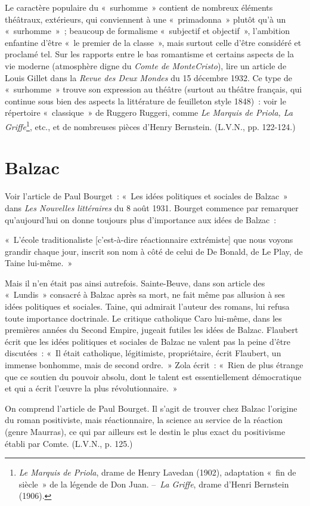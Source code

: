 \documentclass[french,twoside]{book} %
\newenvironment{quoteblock}%
  {\begin{quoting}}
  {\end{quoting}}
\newenvironment{quotebar}{%
    \def\FrameCommand{{\color{rubric!10!}\vrule width 0.5em} \hspace{0.9em}}%
    \def\OuterFrameSep{\itemsep} %
    \MakeFramed {\advance\hsize-\width \FrameRestore}
  }%
  {%
    \endMakeFramed
  }
\renewenvironment{quoteblock}%
  {%
    \savenotes
    \setstretch{0.9}
    \normalfont
    \begin{quotebar}
  }
  {%
    \end{quotebar}
    \spewnotes
  }
\begin{document}
Le caractère populaire du « surhomme » contient de nombreux éléments théâtraux, extérieurs, qui conviennent à une « primadonna » plutôt qu’à un « surhomme » ; beaucoup de formalisme « subjectif et objectif », l’ambition enfantine d’être « le premier de la classe », mais surtout celle d’être considéré et proclamé tel. Sur les rapports entre le bas romantisme et certains aspects de la vie moderne (atmosphère digne du \emph{Comte de MonteCristo}), lire un article de Louis Gillet dans la \emph{Revue des Deux Mondes} du 15 décembre 1932. Ce type de « surhomme » trouve son expression au théâtre (surtout au théâtre français, qui continue sous bien des aspects la littérature de feuilleton style 1848) : voir le répertoire « classique » de Ruggero Ruggeri, comme \emph{Le Marquis de Priola, La Griffe}\footnote{\emph{Le Marquis de Priola}, drame de Henry Lavedan (1902), adaptation « fin de siècle » de la légende de Don Juan. – \emph{La Griffe}, drame d’Henri Bernstein (1906).}, etc., et de nombreuses pièces d’Henry Bernstein. (L.V.N., pp. 122-124.)\par
{\raggedleft \noindent [1933-1934]}
\section[{Balzac}]{Balzac}
\noindent Voir l’article de Paul Bourget : « Les idées politiques et sociales de Balzac » dans \emph{Les Nouvelles littéraires} du 8 août 1931. Bourget commence par remarquer qu’aujourd’hui on donne toujours plus d’importance aux idées de Balzac :\par

\begin{quoteblock}
 \noindent « L'école traditionaliste [c’est-à-dire réactionnaire extrémiste] que nous voyons grandir chaque jour, inscrit son nom à côté de celui de De Bonald, de Le Play, de Taine lui-même. »
\end{quoteblock}

\noindent Mais il n’en était pas ainsi autrefois. Sainte-Beuve, dans son article des « Lundis » consacré à Balzac après sa mort, ne fait même pas allusion à ses idées politiques et sociales. Taine, qui admirait l’auteur des romans, lui refusa toute importance doctrinale. Le critique catholique Caro lui-même, dans les premières années du Second Empire, jugeait futiles les idées de Balzac. Flaubert écrit que les idées politiques et sociales de Balzac ne valent pas la peine d’être discutées : « Il était catholique, légitimiste, propriétaire, écrit Flaubert, un immense bonhomme, mais de second ordre. » Zola écrit : « Rien de plus étrange que ce soutien du pouvoir absolu, dont le talent est essentiellement démocratique et qui a écrit l’œuvre la plus révolutionnaire. »\par
On comprend l’article de Paul Bourget. Il s’agit de trouver chez Balzac l’origine du roman positiviste, mais réactionnaire, la science au service de la réaction (genre Maurras), ce qui par ailleurs est le destin le plus exact du positivisme établi par Comte. (L.V.N., p. 125.)\par
{\raggedleft \noindent [1932-1933]}
\end{document}
